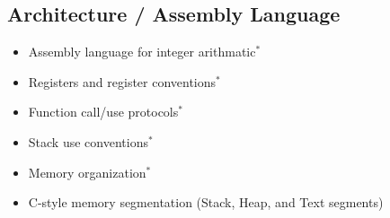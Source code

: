 \subsection{Architecture / Assembly Language}
\label{sec:arch}
\begin{itemize}
  \item Assembly language for integer arithmatic$^*$
  \item Registers and register conventions$^*$
  \item Function call/use protocols$^*$
  \item Stack use conventions$^*$
  \item Memory organization$^*$
  \item C-style memory segmentation (Stack, Heap, and Text segments)
\end{itemize}

